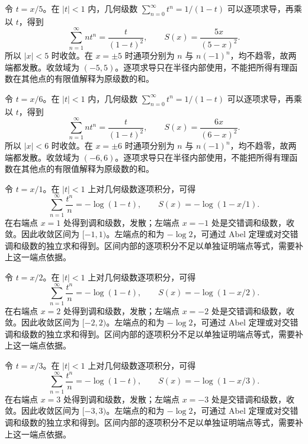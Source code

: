 \documentclass[UTF8,12pt,a4paper,fontset=fandol]{ctexart}
\begin{document}
\begin{solve}\label{ans:c26q12}
令 $t=x/5$。在 $|t|<1$ 内，几何级数 $\sum_{n=0}^\infty t^n=1/(1-t)$ 可以逐项求导，再乘以 $t$，得到
\[
\sum_{n=1}^\infty nt^n=\frac{t}{(1-t)^2},\qquad S(x)=\frac{5x}{(5-x)^2}.
\]
所以 $|x|<5$ 时收敛。在 $x=\pm 5$ 时通项分别为 $n$ 与 $n(-1)^n$，均不趋零，故两端都发散。收敛域为 $(-5,5)$。逐项求导只在半径内部使用，不能把所得有理函数在其他点的有限值解释为原级数的和。
\end{solve}

\begin{solve}\label{ans:c26q13}
令 $t=x/6$。在 $|t|<1$ 内，几何级数 $\sum_{n=0}^\infty t^n=1/(1-t)$ 可以逐项求导，再乘以 $t$，得到
\[
\sum_{n=1}^\infty nt^n=\frac{t}{(1-t)^2},\qquad S(x)=\frac{6x}{(6-x)^2}.
\]
所以 $|x|<6$ 时收敛。在 $x=\pm 6$ 时通项分别为 $n$ 与 $n(-1)^n$，均不趋零，故两端都发散。收敛域为 $(-6,6)$。逐项求导只在半径内部使用，不能把所得有理函数在其他点的有限值解释为原级数的和。
\end{solve}

\begin{solve}\label{ans:c26q14}
令 $t=x/1$。在 $|t|<1$ 上对几何级数逐项积分，可得
\[
\sum_{n=1}^\infty\frac{t^n}n=-\log(1-t),\qquad S(x)=-\log(1-x/1).
\]
在右端点 $x=1$ 处得到调和级数，发散；左端点 $x=-1$ 处是交错调和级数，收敛。因此收敛区间为 $[-1,1)$。左端点的和为 $-\log2$，可通过 Abel 定理或对交错调和级数的独立求和得到。区间内部的逐项积分不足以单独证明端点等式，需要补上这一端点依据。
\end{solve}

\begin{solve}\label{ans:c26q15}
令 $t=x/2$。在 $|t|<1$ 上对几何级数逐项积分，可得
\[
\sum_{n=1}^\infty\frac{t^n}n=-\log(1-t),\qquad S(x)=-\log(1-x/2).
\]
在右端点 $x=2$ 处得到调和级数，发散；左端点 $x=-2$ 处是交错调和级数，收敛。因此收敛区间为 $[-2,2)$。左端点的和为 $-\log2$，可通过 Abel 定理或对交错调和级数的独立求和得到。区间内部的逐项积分不足以单独证明端点等式，需要补上这一端点依据。
\end{solve}

\begin{solve}\label{ans:c26q16}
令 $t=x/3$。在 $|t|<1$ 上对几何级数逐项积分，可得
\[
\sum_{n=1}^\infty\frac{t^n}n=-\log(1-t),\qquad S(x)=-\log(1-x/3).
\]
在右端点 $x=3$ 处得到调和级数，发散；左端点 $x=-3$ 处是交错调和级数，收敛。因此收敛区间为 $[-3,3)$。左端点的和为 $-\log2$，可通过 Abel 定理或对交错调和级数的独立求和得到。区间内部的逐项积分不足以单独证明端点等式，需要补上这一端点依据。
\end{solve}
\end{document}
